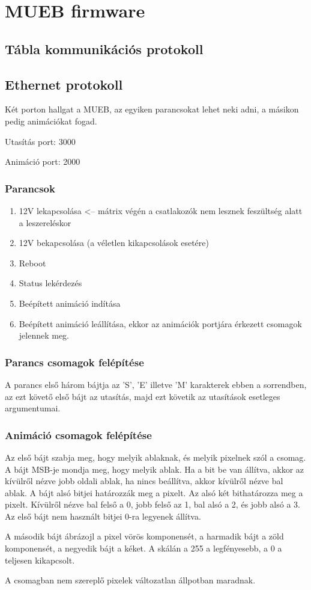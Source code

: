 \chapter{MUEB firmware}

\section{Tábla kommunikációs protokoll}
\section{Ethernet protokoll}
Két porton hallgat a MUEB, az egyiken parancsokat lehet neki adni, a másikon pedig animációkat fogad.
\par
Utasítás port: 3000
\par
Animáció port: 2000

\subsection{Parancsok}
\begin{enumerate}
  \item 12V lekapcsolása <-- mátrix végén a csatlakozók nem lesznek feszültség alatt a leszereléskor
  \item 12V bekapcsolása (a véletlen kikapcsolások esetére)
  \item Reboot
  \item Status lekérdezés
  \item Beépített animáció indítása
  \item Beépített animáció leállítása, ekkor az animációk portjára érkezett csomagok jelennek meg.
\end{enumerate}
\subsection{Parancs csomagok felépítése}
A parancs első három bájtja az 'S', 'E' illetve 'M' karakterek ebben a sorrendben, az ezt követő első bájt az utasítás, majd ezt követik az utasítások esetleges argumentumai. 
\subsection{Animáció csomagok felépítése}
Az első bájt szabja meg, hogy melyik ablaknak, és melyik pixelnek szól a csomag. A bájt MSB-je mondja meg, hogy melyik ablak. Ha a bit be van állítva, akkor az kívülről nézve jobb oldali ablak, ha nincs beállítva, akkor kívülről nézve bal ablak. A bájt alsó bitjei határozzák meg a pixelt. Az alsó két bithatározza meg a pixelt. Kívülről nézve bal felső a 0, jobb felső az 1, bal alsó a 2, és jobb alsó a 3. Az első bájt nem használt bitjei 0-ra legyenek állítva. 
\par
A második bájt ábrázojl a pixel vörös komponensét, a harmadik bájt a zöld komponensét, a negyedik bájt a kéket. A skálán a 255 a legfényesebb, a 0 a teljesen kikapcsolt.
\par
A csomagban nem szereplő pixelek változatlan állpotban maradnak.
